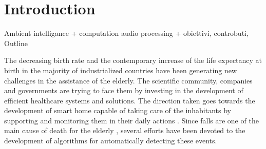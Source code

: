 \chapter{Introduction}\label{ch:intro}


Ambient intelligance + computation audio processing + obiettivi, controbuti, Outline

The decreasing birth rate \cite{eurostat} and the contemporary increase of the life expectancy at birth \cite{Carone2006} in the majority of industrialized countries have been generating new challenges in the assistance of the elderly. The scientific community, companies and governments are trying to face them by investing in the development of efficient healthcare systems and solutions. The direction taken goes towards the development of smart home capable of taking care of the inhabitants by supporting and monitoring them in their daily actions \cite{Dawadi20161188, Principi2015a}. Since falls are one of the main cause of death for the elderly \cite{mubashir2013survey}, several efforts have been devoted to the development of algorithms for automatically detecting these events.






